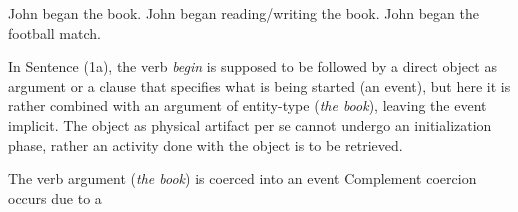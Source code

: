 \documentclass{article}
\begin{document}
\begin{exe}
    \ex \begin{xlist}
        \ex John began the book.
        \ex John began reading/writing the book.
        \ex John began the football match.
    \end{xlist}
\end{exe}

\noindent In Sentence (1a), the verb \emph{begin} is supposed to be followed by a direct object as argument or a clause that specifies what is being started (an event), but here it is rather combined with an argument of entity-type (\emph{the book}), leaving the event implicit. The object as physical artifact per se cannot undergo an initialization phase, rather an activity done with the object is to be retrieved.  




The verb argument (\emph{the book}) is coerced into an event
Complement coercion occurs due to a 


\end{document}
